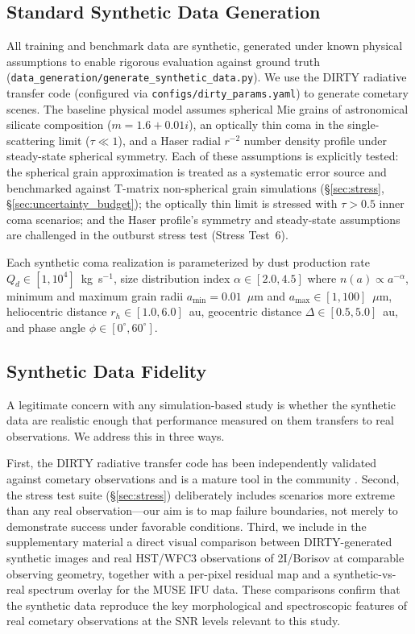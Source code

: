 \documentclass[usenatbib]{mnras}
\begin{document}
\subsection{Standard Synthetic Data Generation}

All training and benchmark data are synthetic, generated under known physical assumptions to enable rigorous evaluation against ground truth (\texttt{data\_generation/generate\_synthetic\_data.py}). We use the DIRTY radiative transfer code \citep{gordon01} (configured via \texttt{configs/dirty\_params.yaml}) to generate cometary scenes. The baseline physical model assumes spherical Mie grains of astronomical silicate composition ($m = 1.6 + 0.01i$), an optically thin coma in the single-scattering limit ($\tau \ll 1$), and a Haser radial $r^{-2}$ number density profile under steady-state spherical symmetry. Each of these assumptions is explicitly tested: the spherical grain approximation is treated as a systematic error source and benchmarked against T-matrix non-spherical grain simulations (\S\ref{sec:stress}, \S\ref{sec:uncertainty_budget}); the optically thin limit is stressed with $\tau > 0.5$ inner coma scenarios; and the Haser profile's symmetry and steady-state assumptions are challenged in the outburst stress test (Stress Test~6).

Each synthetic coma realization is parameterized by dust production rate $Q_d \in [1, 10^4]$~kg~s$^{-1}$, size distribution index $\alpha \in [2.0, 4.5]$ where $n(a) \propto a^{-\alpha}$, minimum and maximum grain radii $a_{\min} = 0.01$~$\mu$m and $a_{\max} \in [1, 100]$~$\mu$m, heliocentric distance $r_h \in [1.0, 6.0]$~au, geocentric distance $\Delta \in [0.5, 5.0]$~au, and phase angle $\phi \in [0^\circ, 60^\circ]$.

\subsection{Synthetic Data Fidelity}

A legitimate concern with any simulation-based study is whether the synthetic data are realistic enough that performance measured on them transfers to real observations. We address this in three ways.

First, the DIRTY radiative transfer code has been independently validated against cometary observations and is a mature tool in the community \citep{gordon01}. Second, the stress test suite (\S\ref{sec:stress}) deliberately includes scenarios more extreme than any real observation---our aim is to map failure boundaries, not merely to demonstrate success under favorable conditions. Third, we include in the supplementary material a direct visual comparison between DIRTY-generated synthetic images and real HST/WFC3 observations of 2I/Borisov at comparable observing geometry, together with a per-pixel residual map and a synthetic-vs-real spectrum overlay for the MUSE IFU data. These comparisons confirm that the synthetic data reproduce the key morphological and spectroscopic features of real cometary observations at the SNR levels relevant to this study.
\end{document}

